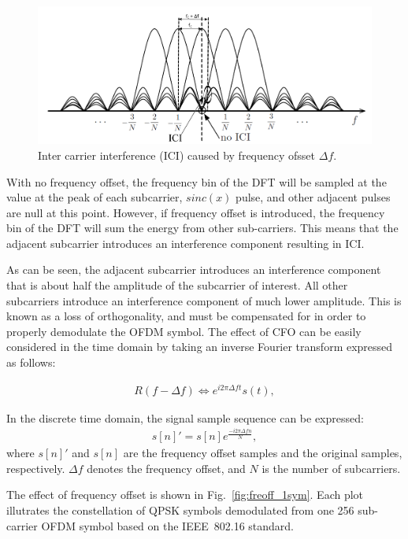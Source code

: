 \begin{figure}
	\centerline{\includegraphics [width=0.8\columnwidth] {Figures/OFDM-subcarrier-freoff.pdf} }
	\caption{Inter carrier interference (ICI) caused by frequency ofsset $\Delta f$.}
	\label{fig:OFDM-subcarrier-freoff}
\end{figure}

With no frequency offset, the frequency bin of the DFT will be sampled at the value at the peak of each subcarrier, $sinc(x)$ pulse, and other adjacent pulses are null at this point. 
However, if frequency offset is introduced, the frequency bin of the DFT will sum the energy from other sub-carriers. 
This means that the adjacent subcarrier introduces an interference component resulting in ICI. 

As can be seen, the adjacent subcarrier introduces an interference component that is about half the amplitude of the subcarrier of interest. 
All other subcarriers introduce an interference component of much lower amplitude. 
This is known as a loss of orthogonality, and must be compensated for in order to properly demodulate the OFDM symbol.
The effect of CFO can be easily considered in the time domain by taking an inverse Fourier transform expressed as follows:

\begin{eqnarray}
\label{equ:}
             R(f - \Delta f) \Leftrightarrow  e^{i2\pi \Delta ft} s(t),
\end{eqnarray}	

In the discrete time domain, the signal sample sequence can be expressed: 
\begin{eqnarray}
\label{equ:}
            s[n]' = s[n] e^{\frac{− i2\pi \Delta fn}{N}},
\end{eqnarray}
where $s[n]'$ and $s[n]$ are the frequency offset samples and the original samples, respectively.
$\Delta f$ denotes the frequency offset, and $N$ is the number of subcarriers. 

The effect of frequency offset is shown in Fig.~\ref{fig:freoff_1sym}. Each plot illutrates the constellation of QPSK symbols demodulated from one 256 sub-carrier OFDM symbol based on the IEEE~802.16 standard.

